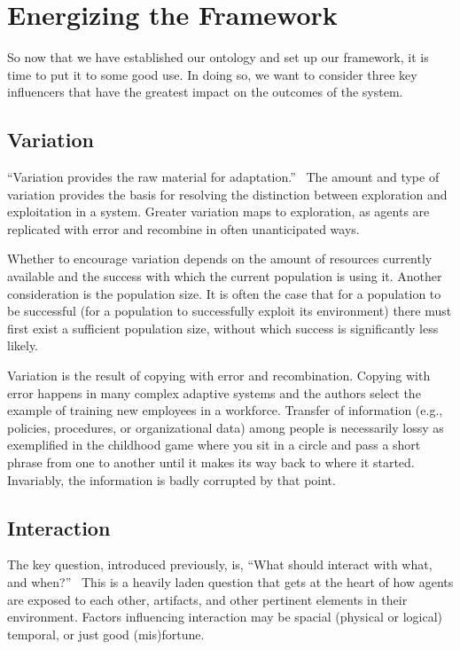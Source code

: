 \documentclass[jou,apacite]{apa6}
\begin{document}
\section{Energizing the Framework}
So now that we have established our ontology and set up our framework, it is time to put it to some good use.  In doing so, we want to consider three key influencers that have the greatest impact on the outcomes of the system.

\subsection{Variation}
``Variation provides the raw material for adaptation.''~\cite[page 32]{Axelrod}  The amount and type of variation provides the basis for resolving the distinction between exploration and exploitation in a system.  Greater variation maps to exploration, as agents are replicated with error and recombine in often unanticipated ways.  

Whether to encourage variation depends on the amount of resources currently available and the success with which the current population is using it.  Another consideration is the population size.  It is often the case that for a population to be successful (for a population to successfully exploit its environment) there must first exist a sufficient population size, without which success is significantly less likely.

Variation is the result of copying with error and recombination.  Copying with error happens in many complex adaptive systems and the authors select the example of training new employees in a workforce.  Transfer of information (e.g., policies, procedures, or organizational data) among people is necessarily lossy as exemplified in the childhood game where you sit in a circle and pass a short phrase from one to another until it makes its way back to where it started.  Invariably, the
information is badly corrupted by that point.

\subsection{Interaction}
The key question, introduced previously, is, ``What should interact with what, and when?''~\cite[page 62]{Axelrod}  This is a heavily laden question that gets at the heart of how agents are exposed to each other, artifacts, and other pertinent elements in their environment.  Factors influencing interaction may be spacial (physical or logical) temporal, or just good (mis)fortune.
\end{document}
